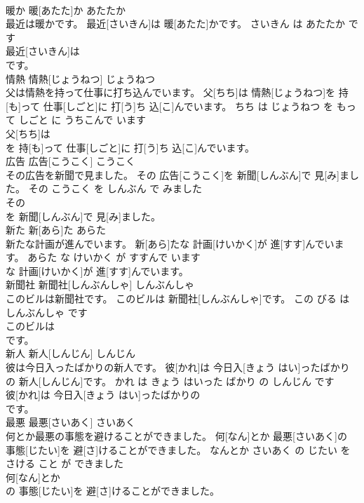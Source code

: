 \documentclass[8pt]{extreport}
\begin{document}
\begin{CJK}{UTF8}{min}
\\	暖か	暖[あたた]か	あたたか	
\\	最近は暖かです。	最近[さいきん]は 暖[あたた]かです。	さいきん は あたたか です	
\\	最近[さいきん]は
\\	です。			
\\	情熱	情熱[じょうねつ]	じょうねつ	
\\	父は情熱を持って仕事に打ち込んでいます。	父[ちち]は 情熱[じょうねつ]を 持[も]って 仕事[しごと]に 打[う]ち 込[こ]んでいます。	ちち は じょうねつ を もって しごと に うちこんで います	
\\	父[ちち]は
\\	を 持[も]って 仕事[しごと]に 打[う]ち 込[こ]んでいます。			
\\	広告	広告[こうこく]	こうこく	
\\	その広告を新聞で見ました。	その 広告[こうこく]を 新聞[しんぶん]で 見[み]ました。	その こうこく を しんぶん で みました	
\\	その
\\	を 新聞[しんぶん]で 見[み]ました。			
\\	新た	新[あら]た	あらた	
\\	新たな計画が進んでいます。	新[あら]たな 計画[けいかく]が 進[すす]んでいます。	あらた な けいかく が すすんで います	
\\	な 計画[けいかく]が 進[すす]んでいます。			
\\	新聞社	新聞社[しんぶんしゃ]	しんぶんしゃ	
\\	このビルは新聞社です。	このビルは 新聞社[しんぶんしゃ]です。	この びる は しんぶんしゃ です	
\\	このビルは
\\	です。			
\\	新人	新人[しんじん]	しんじん	
\\	彼は今日入ったばかりの新人です。	彼[かれ]は 今日入[きょう はい]ったばかりの 新人[しんじん]です。	かれ は きょう はいった ばかり の しんじん です	
\\	彼[かれ]は 今日入[きょう はい]ったばかりの
\\	です。			
\\	最悪	最悪[さいあく]	さいあく	
\\	何とか最悪の事態を避けることができました。	何[なん]とか 最悪[さいあく]の 事態[じたい]を 避[さ]けることができました。	なんとか さいあく の じたい を さける こと が できました	
\\	何[なん]とか
\\	の 事態[じたい]を 避[さ]けることができました。			

\end{CJK}
\end{document}
